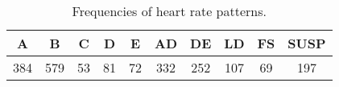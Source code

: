 \begin{table}[ht]
\centering
\caption{Frequencies of heart rate patterns.}
\label{tab:heart_rate_pattern}
\begin{tabular}{cccccccccc}
\hline
A & B & C & D & E & AD & DE & LD & FS & SUSP \\
\hline
384 & 579 & 53 & 81 & 72 & 332 & 252 & 107 & 69 & 197 \\
\hline
\end{tabular}
\end{table}
